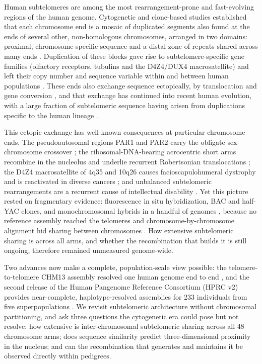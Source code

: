 \documentclass[pdflatex,mathphys]{jnl}
\begin{document}
\maketitle

Human subtelomeres are among the most rearrangement-prone and fast-evolving
regions of the human genome. Cytogenetic and clone-based studies established that each chromosome end is a
mosaic of duplicated segments also found at the ends of several other,
non-homologous chromosomes, arranged in two domains: proximal,
chromosome-specific sequence and a distal zone of repeats shared across many
ends \cite{MeffordTrask2002,Flint1997,Linardopoulou2005}.
Duplication of these blocks gave rise to subtelomere-specific gene families
(olfactory receptors, tubulins and the D4Z4/DUX4 macrosatellite) and left their
copy number and sequence variable within and between human populations
\cite{MeffordTrask2002}.
These ends also exchange sequence ectopically, by translocation and gene
conversion \cite{Brown1990,Wilkie1991,Trask1991}, and that exchange has
continued into recent human evolution, with a large fraction of subtelomeric
sequence having arisen from duplications specific to the human lineage
\cite{Linardopoulou2005}.

This ectopic exchange has well-known consequences at particular chromosome ends.
The pseudoautosomal regions PAR1 and PAR2 carry the obligate sex-chromosome
crossover \cite{Rouyer1986,sexchrompars_bellott2024}; the ribosomal-DNA-bearing
acrocentric short arms recombine in the nucleolus and underlie recurrent
Robertsonian translocations
\cite{acrocentric_Altemose2022,acrocentric_Guarracino2025ape}; the D4Z4
macrosatellite of 4q35 and 10q26 causes facioscapulohumeral dystrophy and is
reactivated in diverse cancers
\cite{dux4_d4z4_fshd_lemmers2010worldwide,dux4_cancer_Chew2019}; and unbalanced
subtelomeric rearrangements are a recurrent cause of intellectual disability
\cite{MeffordTrask2002}.
Yet this picture rested on fragmentary evidence: fluorescence in situ
hybridization, BAC and half-YAC clones, and monochromosomal hybrids in a handful
of genomes \cite{Mefford2001,Riethman2004,Ambrosini2007}, because no reference
assembly reached the telomeres \cite{Nurk2022} and chromosome-by-chromosome
alignment hid sharing between chromosomes \cite{Liao2023}.
How extensive subtelomeric sharing is across all arms, and whether the
recombination that builds it is still ongoing, therefore remained unmeasured
genome-wide.

Two advances now make a complete, population-scale view possible: the
telomere-to-telomere CHM13 assembly resolved one human genome end to end
\cite{Nurk2022}, and the second release of the Human Pangenome Reference
Consortium (HPRC v2) provides near-complete, haplotype-resolved assemblies for
233 individuals from five superpopulations \cite{hprc_hprcv2_2025}.
We revisit subtelomeric architecture without chromosomal partitioning, and ask
three questions the cytogenetic era could pose but not resolve: how extensive is
inter-chromosomal subtelomeric sharing across all 48 chromosome arms; does
sequence similarity predict three-dimensional proximity in the nucleus; and can
the recombination that generates and maintains it be observed directly within
pedigrees.
\end{document}
